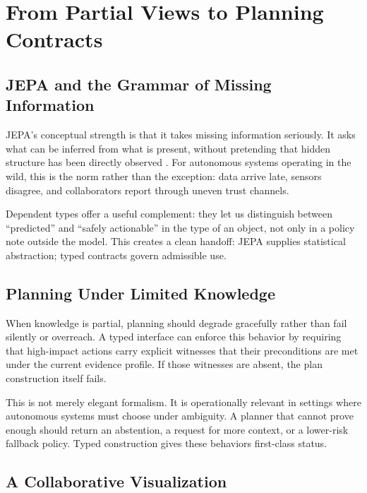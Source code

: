 \documentclass[12pt, a4paper]{article}
\begin{document}
\section{From Partial Views to Planning Contracts}
\label{sec:bridge}

\subsection{JEPA and the Grammar of Missing Information}

JEPA's conceptual strength is that it takes missing information seriously. It
asks what can be inferred from what is present, without pretending that hidden
structure has been directly observed \citep{lecun2022path, assran2023ijepa}.
For autonomous systems operating in the wild, this is the norm rather than the
exception: data arrive late, sensors disagree, and collaborators report through
uneven trust channels.

Dependent types offer a useful complement: they let us distinguish between
``predicted'' and ``safely actionable'' in the type of an object, not only in a
policy note outside the model. This creates a clean handoff: JEPA supplies
statistical abstraction; typed contracts govern admissible use.

\subsection{Planning Under Limited Knowledge}

When knowledge is partial, planning should degrade gracefully rather than fail
silently or overreach. A typed interface can enforce this behavior by requiring
that high-impact actions carry explicit witnesses that their preconditions are
met under the current evidence profile. If those witnesses are absent, the plan
construction itself fails.

This is not merely elegant formalism. It is operationally relevant in settings
where autonomous systems must choose under ambiguity. A planner that cannot prove
enough should return an abstention, a request for more context, or a lower-risk
fallback policy. Typed construction gives these behaviors first-class status.

\subsection{A Collaborative Visualization}
\end{document}
